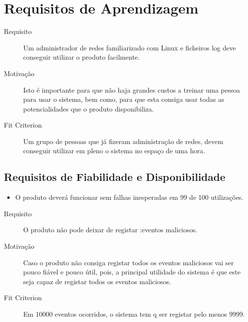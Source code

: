 



\section{Requisitos de Aprendizagem}
\begin{description}
\item[Requisito] Um administrador de redes familiarizado com Linux e ficheiros log deve conseguir utilizar o produto facilmente.
\item[Motivação] Isto é importante para que não haja grandes custos a treinar uma pessoa para usar o sistema, bem como, para que esta consiga usar 
todas as potencialidades que o produto disponibiliza.
\item[Fit Criterion] Um grupo de pessoas que já fizeram administração de redes, devem conseguir utilizar em pleno o sistema no espaço de uma hora.
\end{description}





\subsection{Requisitos de Fiabilidade e Disponibilidade}
\begin{itemize}
\item O produto deverá funcionar sem falhas inesperadas em 99 de 100 utilizações.
\end{itemize}





\begin{description}
\item[Requisito] O produto não pode deixar de registar :eventos maliciosos.
\item[Motivação] Caso o produto não consiga registar todos os eventos maliciosos vai ser pouco fiável e pouco útil, pois, a principal utilidade
do sistema é que este seja capaz de registar todos os eventos maliciosos.
\item[Fit Criterion] Em 10000 eventos ocorridos, o sistema tem q ser registar pelo menos 9999. 
\end{description}



